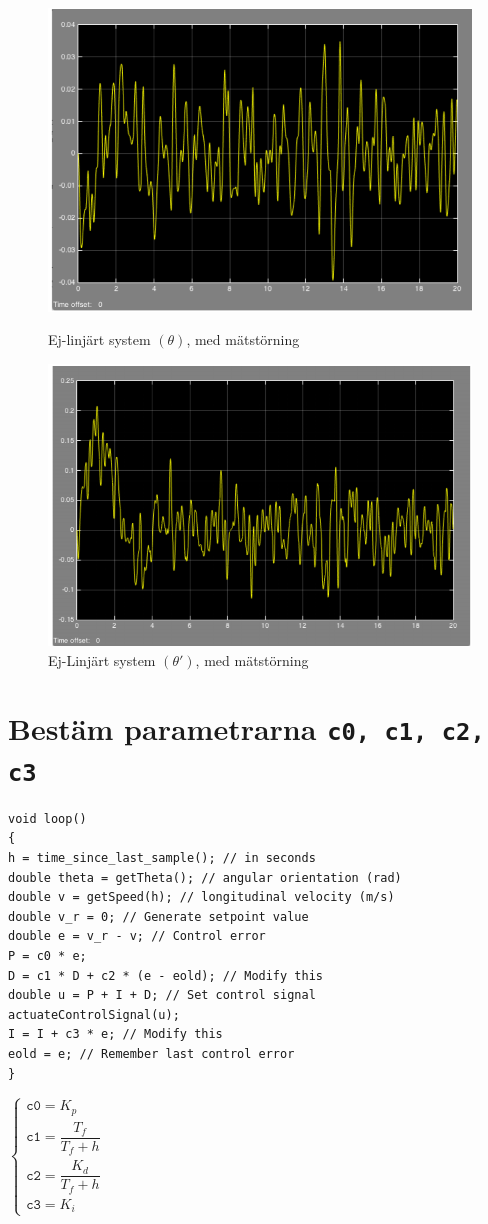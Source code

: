 \documentclass[11pt]{article}
\begin{document}
\begin{figure}[h!]
\centering
\includegraphics[scale=0.9]{Figures/simlink_3}
\caption{Ej-linjärt system $(\theta)$, med mätstörning}
\vspace{3em}
\includegraphics[scale=0.9]{Figures/simlink_4}
\caption{Ej-Linjärt system $(\theta \prime)$, med mätstörning}
\end{figure}
\newpage
\section{Bestäm parametrarna \texttt{c0, c1, c2, c3}}
\begin{lstlisting}[frame=single]
void loop()
{
h = time_since_last_sample(); // in seconds
double theta = getTheta(); // angular orientation (rad)
double v = getSpeed(h); // longitudinal velocity (m/s)
double v_r = 0; // Generate setpoint value
double e = v_r - v; // Control error
P = c0 * e;
D = c1 * D + c2 * (e - eold); // Modify this
double u = P + I + D; // Set control signal
actuateControlSignal(u);
I = I + c3 * e; // Modify this
eold = e; // Remember last control error
}
\end{lstlisting}\vspace*{2em}
$
\begin{cases}
\texttt{c0} = K_p \\[1em]
\texttt{c1} = \dfrac{T_f}{T_f+h}\\[1em]
\texttt{c2} = \dfrac{K_d}{T_f+h} \\[1em]
\texttt{c3} = K_i
\end{cases}
$
\newpage
\end{document}
